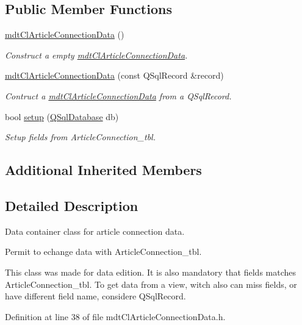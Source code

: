 \subsection*{Public Member Functions}
\begin{DoxyCompactItemize}
\item 
\hyperlink{classmdt_cl_article_connection_data_a617e468db5962199637a4e00534728ea}{mdt\-Cl\-Article\-Connection\-Data} ()
\begin{DoxyCompactList}\small\item\em Construct a empty \hyperlink{classmdt_cl_article_connection_data}{mdt\-Cl\-Article\-Connection\-Data}. \end{DoxyCompactList}\item 
\hyperlink{classmdt_cl_article_connection_data_a55b2069ec175c131375c25e2194d6d95}{mdt\-Cl\-Article\-Connection\-Data} (const Q\-Sql\-Record \&record)
\begin{DoxyCompactList}\small\item\em Contruct a \hyperlink{classmdt_cl_article_connection_data}{mdt\-Cl\-Article\-Connection\-Data} from a Q\-Sql\-Record. \end{DoxyCompactList}\item 
bool \hyperlink{classmdt_cl_article_connection_data_a224a769e87de03c2ced03b64a1c4a6ad}{setup} (\hyperlink{class_q_sql_database}{Q\-Sql\-Database} db)
\begin{DoxyCompactList}\small\item\em Setup fields from Article\-Connection\-\_\-tbl. \end{DoxyCompactList}\end{DoxyCompactItemize}
\subsection*{Additional Inherited Members}


\subsection{Detailed Description}
Data container class for article connection data. 

Permit to echange data with Article\-Connection\-\_\-tbl.

This class was made for data edition. It is also mandatory that fields matches Article\-Connection\-\_\-tbl. To get data from a view, witch also can miss fields, or have different field name, considere Q\-Sql\-Record. 

Definition at line 38 of file mdt\-Cl\-Article\-Connection\-Data.\-h.



